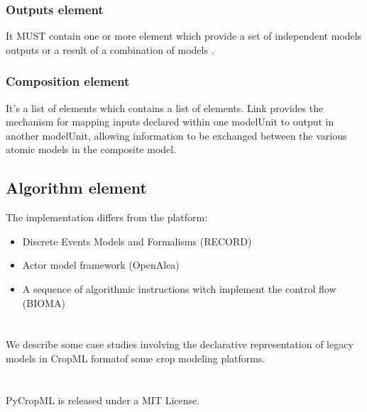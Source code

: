 \documentclass[letterpaper,13pt,english]{sphinxmanual}
\begin{document}
\subsection{Outputs element}
\label{\detokenize{user/description:id2}}
It MUST contain one or more  element which provide a set of independent models outputs or a result of a combination of models .


\subsection{Composition element}
\label{\detokenize{user/description:composition-element}}
It’s a list of  elements which contains a list of  elements.
Link provides the mechanism for mapping inputs declared within one modelUnit to output in another modelUnit,
allowing information to be exchanged between the various atomic models in the composite model.


\section{Algorithm element}
\label{\detokenize{user/description:id3}}
The implementation differs from the platform:
\begin{itemize}
\item {} 
Discrete Events Models and Formalisms (RECORD)

\item {} 
Actor model framework (OpenAlea)

\item {} 
A sequence of algorithmic instructions witch implement the control flow (BIOMA)

\end{itemize}


\chapter{}
\label{\detokenize{user/usecases:usecases}}\label{\detokenize{user/usecases::doc}}
We describe some case studies involving the declarative representation of legacy models in CropML formatof
some crop modeling platforms.


\chapter{}
\label{\detokenize{user/license::doc}}\label{\detokenize{user/license:licence}}
PyCropML is released under a MIT License.
\end{document}
